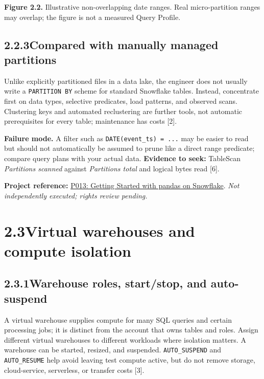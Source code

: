 \documentclass[11pt,twoside]{article}
\newcommand{\topic}[2]{\subsection*{#1\quad #2}}
\newcommand{\repo}[2]{\par\begingroup\fontsize{8.0}{9.6}\selectfont\sffamily\color{inkgray}\textbf{Project reference:} \href{#2}{#1}. \textit{Not independently executed; rights review pending.}\par\endgroup}
\begin{document}
\begin{center}
\end{center}
{\small\color{inkgray}\textbf{Figure 2.2.} Illustrative non-overlapping date ranges. Real micro-partition ranges may overlap; the figure is not a measured Query Profile.}\par

\topic{2.2.3}{Compared with manually managed partitions}
Unlike explicitly partitioned files in a data lake, the engineer does not usually write a \texttt{PARTITION BY} scheme for standard Snowflake tables. Instead, concentrate first on data types, selective predicates, load patterns, and observed scans. Clustering keys and automated reclustering are further tools, not automatic prerequisites for every table; maintenance has costs [2].

\textbf{Failure mode.} A filter such as \texttt{DATE(event\_ts) = ...} may be easier to read but should not automatically be assumed to prune like a direct range predicate; compare query plans with your actual data. \textbf{Evidence to seek:} TableScan \emph{Partitions scanned} against \emph{Partitions total} and logical bytes read [6].
\repo{P013: Getting Started with pandas on Snowflake}{https://github.com/Snowflake-Labs/sfguide-getting-started-with-pandas-on-snowflake}

\newpage
\section*{2.3\quad Virtual warehouses and compute isolation}
\topic{2.3.1}{Warehouse roles, start/stop, and auto-suspend}
A virtual warehouse supplies compute for many SQL queries and certain processing jobs; it is distinct from the account that owns tables and roles. Assign different virtual warehouses to different workloads where isolation matters. A warehouse can be started, resized, and suspended. \texttt{AUTO\_SUSPEND} and \texttt{AUTO\_RESUME} help avoid leaving test compute active, but do not remove storage, cloud-service, serverless, or transfer costs [3].
\end{document}
